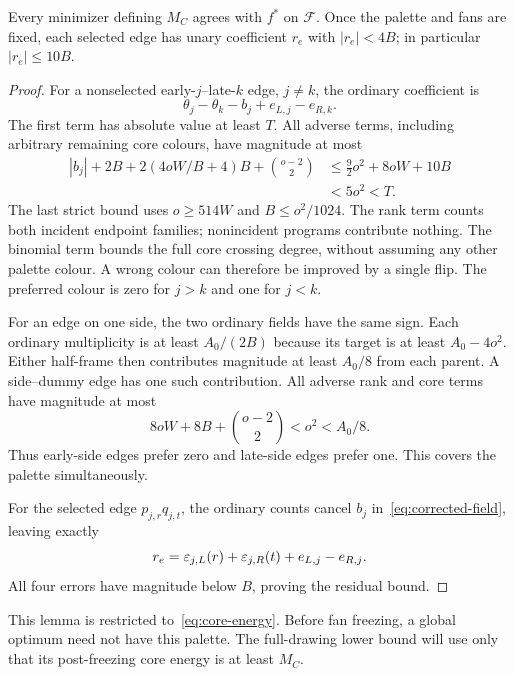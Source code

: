 \begin{lemma}\label{lem:palette}
Every minimizer defining $M_C$ agrees with $f^*$ on $\mathcal F$. Once the palette and fans are fixed, each selected edge has unary coefficient $r_e$ with $|r_e|<4B$; in particular $|r_e|\leq10B$.
\end{lemma}
\begin{proof}
For a nonselected early-$j$--late-$k$ edge, $j\ne k$, the ordinary coefficient is
\[
\theta_j-\theta_k-b_j+e_{L,j}-e_{R,k}.
\]
The first term has absolute value at least $T$. All adverse terms, including arbitrary remaining core colours, have magnitude at most
\begin{align*}
|b_j|+2B+2(4oW/B+4)B+\binom{o-2}{2}
&\leq\tfrac92o^2+8oW+10B\\
&<5o^2<T.
\end{align*}
The last strict bound uses $o\geq514W$ and $B\leq o^2/1024$. The rank term counts both incident endpoint families; nonincident programs contribute nothing. The binomial term bounds the full core crossing degree, without assuming any other palette colour. A wrong colour can therefore be improved by a single flip. The preferred colour is zero for $j>k$ and one for $j<k$.

For an edge on one side, the two ordinary fields have the same sign. Each ordinary multiplicity is at least $A_0/(2B)$ because its target is at least $A_0-4o^2$. Either half-frame then contributes magnitude at least $A_0/8$ from each parent. A side--dummy edge has one such contribution. All adverse rank and core terms have magnitude at most
\[
8oW+8B+\binom{o-2}{2}<o^2<A_0/8.
\]
Thus early-side edges prefer zero and late-side edges prefer one. This covers the palette simultaneously.

For the selected edge $p_{j,r}q_{j,t}$, the ordinary counts cancel $b_j$ in~\eqref{eq:corrected-field}, leaving exactly
\begin{equation}\label{eq:selected-residual}
r_e=\varepsilon_{j,L}(r)+\varepsilon_{j,R}(t)+e_{L,j}-e_{R,j}.
\end{equation}
All four errors have magnitude below $B$, proving the residual bound.
\end{proof}

This lemma is restricted to~\eqref{eq:core-energy}. Before fan freezing, a global optimum need not have this palette. The full-drawing lower bound will use only that its post-freezing core energy is at least $M_C$.

